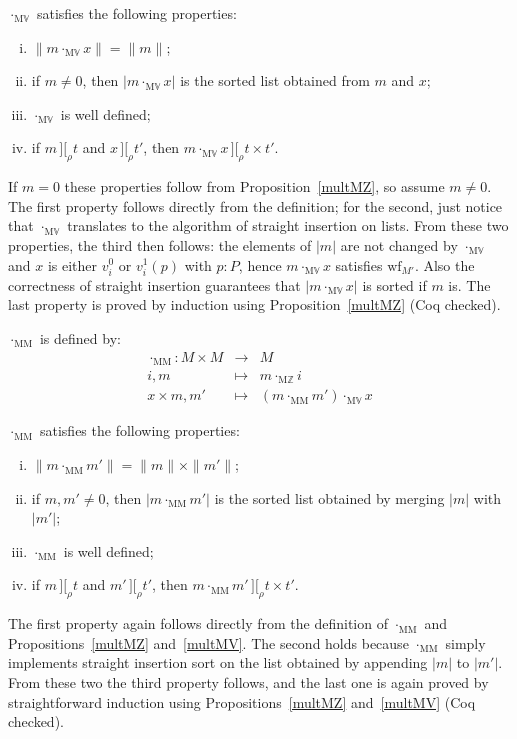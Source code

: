 \documentclass[numreferences]{kluwer}
\newcommand{\intII}{\,]\![}
\newcommand{\intrel}{\mathbin{\intII_{\rho}}}
\newcommand{\Z}{{\mathbb Z}}
\newcommand{\V}{{\mathbb V}}
\newcommand{\wf}{\ensuremath{\mathrm{wf}}}
\newcommand{\multMZ}{\ensuremath{\cdot_{\mathrm M\Z}}}
\newcommand{\multMV}{\ensuremath{\cdot_{\mathrm M\V}}}
\newcommand{\multMM}{\ensuremath{\cdot_{\mathrm{MM}}}}
\begin{document}
\begin{article}
\begin{proposition}\label{multMV}
{\multMV} satisfies the following properties:
\begin{enumerate}[(i)]
\item $\|m\multMV x\|=\|m\|$;
\item if $m\neq 0$, then $|m\multMV x|$ is the sorted
list obtained from $m$ and $x$;
\item {\multMV} is well defined;
\item if $m\intrel t$ and $x\intrel t'$, then
$m\multMV x\intrel t\times t'$.
\end{enumerate}
\end{proposition}
\begin{pf}
If $m=0$ these properties follow from Proposition~\ref{multMZ}, so assume
$m\neq 0$.
The first property follows directly from the definition; for the
second, just notice that {\multMV} translates to the
algorithm of straight insertion on lists.
From these two properties, the third then follows: the elements of $|m|$
are not changed by {\multMV} and $x$ is either $v^0_i$ or
$v^1_i(p)$ with $p:P$, hence $m\multMV x$ satisfies $\wf_{M'}$.
Also the correctness of straight insertion guarantees that
$|m\multMV x|$ is sorted if $m$ is.
The last property is proved by induction using
Proposition~\ref{multMZ} (Coq checked).
\end{pf}

\begin{definition}\label{defn:multMM} {\multMM} is defined by:
\begin{eqnarray*}
\multMM : M \times M & \to & M \\
 i, m & \mapsto & m\multMZ i \\
 x\times m, m' & \mapsto & (m\multMM m')\multMV x
\end{eqnarray*}
\end{definition}

\begin{proposition}\label{multMM}
{\multMM} satisfies the following properties:
\begin{enumerate}[(i)]
\item $\|m\multMM m'\|=\|m\|\times\|m'\|$;
\item if $m,m'\neq 0$, then $|m\multMM m'|$ is the sorted
list obtained by merging $|m|$ with $|m'|$;
\item {\multMM} is well defined;
\item if $m\intrel t$ and $m'\intrel t'$, then
$m\multMM m'\intrel t\times t'$.
\end{enumerate}
\end{proposition}
\begin{pf}
The first property again follows directly from the definition of {\multMM}
and Propositions~\ref{multMZ} and~\ref{multMV}.
The second holds because {\multMM} simply implements straight insertion sort
on the list obtained by appending $|m|$ to $|m'|$.
From these two the third property follows, and the last one is again proved by
straightforward induction using Propositions~\ref{multMZ} and~\ref{multMV}
(Coq checked).
\end{pf}


\end{article}
\end{document}

